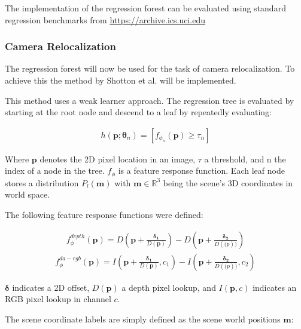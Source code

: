 The implementation of the regression forest can be evaluated using standard regression benchmarks from
\href{https://archive.ics.uci.edu/ml/datasets.html?format=&task=reg&att=&area=&numAtt=&numIns=&type=&sort=nameUp&view=table}{https://archive.ics.uci.edu}


\subsubsection{Camera Relocalization} %
\label{ssub:camera_relocalization}

The regression forest will now be used for the task of camera relocalization. To achieve this the method by Shotton et al. \cite{shotton} will be implemented.

This method uses a weak learner approach. The regression tree is evaluated by starting at the root node and descend to a leaf by repeatedly evaluating:

\begin{eqnarray}\label{eqn:weaklearner}
  h(\mathbf{p};\mathbf{\theta}_n) = [ f_{\phi_n}(\mathbf{p}) \geq \tau_n ]
\end{eqnarray}


Where $\mathbf{p}$ denotes the 2D pixel location in an image, $\tau$ a threshold, and n the index of a node in the tree. $f_{\phi}$ is a feature response function. Each leaf node stores a distribution $P_{l}(\mathbf{m})$ with $\mathbf{m} \in \mathbb{R}^3$ being the scene's 3D coordinates in world space.

The following feature response functions were defined:

\begin{eqnarray}
  f_{\phi}^{depth}(\mathbf{p}) = D(\mathbf{p} + \frac{\mathbf{\delta_1}}{D(\mathbf{p})}) - D(\mathbf{p} + \frac{\mathbf{\delta_2}}{D(\mathbf(p))})
\end{eqnarray}
\begin{eqnarray}
  f_{\phi}^{da-rgb}(\mathbf{p}) = I(\mathbf{p} + \frac{\mathbf{\delta_1}}{D(\mathbf{p})},c_1) - I(\mathbf{p} + \frac{\mathbf{\delta_2}}{D(\mathbf(p))},c_2)
\end{eqnarray}

$\mathbf{\delta}$ indicates a 2D offset, $D(\mathbf{p})$ a depth pixel lookup, and $I(\mathbf{p},c)$ indicates an RGB pixel lookup in channel $c$.

The scene coordinate labels are simply defined as the scene world positions $\mathbf{m}$:

